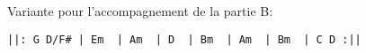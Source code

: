 

\tune

Variante pour l'accompagnement de la partie B:

\begin{verbatim}
||: G D/F# | Em  | Am  | D  | Bm  | Am  | Bm  | C D :||
\end{verbatim}